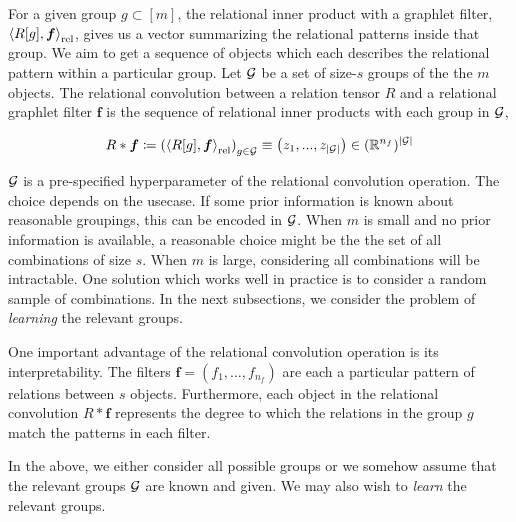 For a given group $g \subset [m]$, the relational inner product with a graphlet filter, $\left \langle R[g], \bm{f} \right\rangle_\mathrm{rel}$, gives us a vector summarizing the relational patterns inside that group. We aim to get a sequence of objects which each describes the relational pattern within a particular group. Let ${\mathcal{G}}$ be a set of size-$s$ groups of the the $m$ objects. The relational convolution between a relation tensor $R$ and a relational graphlet filter $\bm{f}$ is the sequence of relational inner products with each group in ${\mathcal{G}}$,

\begin{equation}
    \label{eq:relational_convolution}
    R \ast \bm{f} \coloneq \left( \left\langle R[g], \boldsymbol{f} \right\rangle_\mathrm{rel} \right)_{g \in {\mathcal{G}}} \equiv \left(z_1, ..., z_{\left\lvert{\mathcal{G}}\right\rvert}\right) \in (\mathbb{R}^{n_f})^{\left\lvert{\mathcal{G}}\right\rvert}
\end{equation}

${\mathcal{G}}$ is a pre-specified hyperparameter of the relational convolution operation. The choice depends on the usecase. If some prior information is known about reasonable groupings, this can be encoded in ${\mathcal{G}}$. When $m$ is small and no prior information is available, a reasonable choice might be the the set of all combinations of size $s$. When $m$ is large, considering all combinations will be intractable. One solution which works well in practice is to consider a random sample of combinations. In the next subsections, we consider the problem of \textit{learning} the relevant groups.

One important advantage of the relational convolution operation is its interpretability. The filters $\bm{f} = (f_1, \ldots, f_{n_f})$ are each a particular pattern of relations between $s$ objects. Furthermore, each object in the relational convolution $R \ast \bm{f}$ represents the degree to which the relations in the group $g$ match the patterns in each filter.

In the above, we either consider all possible groups or we somehow assume that the relevant groups ${\mathcal{G}}$ are known and given. We may also wish to \textit{learn} the relevant groups.

